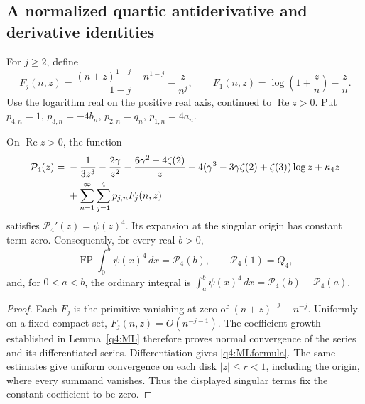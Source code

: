 \subsection{A normalized quartic antiderivative and derivative identities}

For $j\geq2$, define
\[
 F_j(n,z)=\frac{(n+z)^{1-j}-n^{1-j}}{1-j}-\frac{z}{n^j},
 \qquad
 F_1(n,z)=\log\left(1+\frac zn\right)-\frac zn.
\]
Use the logarithm real on the positive real axis, continued to
$\operatorname{Re}z>0$.  Put
$p_{4,n}=1$, $p_{3,n}=-4b_n$, $p_{2,n}=q_n$, $p_{1,n}=4a_n$.

\begin{corollary}\label{q4:primitive}
On $\operatorname{Re}z>0$, the function
\begin{align}\label{q4:primitiveformula}
 \mathcal P_4(z)={}&-\frac1{3z^3}-\frac{2\gamma}{z^2}
       -\frac{6\gamma^2-4\zeta(2)}z
       +4(\gamma^3-3\gamma\zeta(2)+\zeta(3))\log z
       +\kappa_4z\notag\\
 &+\sum_{n=1}^\infty\sum_{j=1}^4p_{j,n}F_j(n,z)
\end{align}
satisfies $\mathcal P_4'(z)=\psi(z)^4$.  Its expansion at the singular
origin has constant term zero.  Consequently, for every real $b>0$,
\[
 \operatorname{FP}\int_0^b\psi(x)^4\,dx=\mathcal P_4(b),
 \qquad \mathcal P_4(1)=Q_4,
\]
and, for $0<a<b$, the ordinary integral is
$\int_a^b\psi(x)^4\,dx=\mathcal P_4(b)-\mathcal P_4(a)$.
\end{corollary}

\begin{proof}
Each $F_j$ is the primitive vanishing at zero of
$(n+z)^{-j}-n^{-j}$.  Uniformly on a fixed compact set,
$F_j(n,z)=O(n^{-j-1})$.  The coefficient growth established in
Lemma~\ref{q4:ML} therefore proves normal convergence of the series and
its differentiated series.  Differentiation gives
\eqref{q4:MLformula}.  The same estimates give uniform convergence on
each disk $|z|\leq r<1$, including the origin, where every summand
vanishes.  Thus the displayed singular terms fix the constant
coefficient to be zero.
\end{proof}

